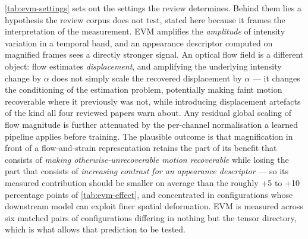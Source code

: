 \autoref{tab:evm-settings} sets out the settings the review determines. Behind them lies a hypothesis the review corpus does not test, stated here because it frames the interpretation of the measurement. EVM amplifies the \textit{amplitude} of intensity variation in a temporal band, and an appearance descriptor computed on magnified frames sees a directly stronger signal. An optical flow field is a different object: flow estimates \textit{displacement}, and amplifying the underlying intensity change by $\alpha$ does not simply scale the recovered displacement by $\alpha$ --- it changes the conditioning of the estimation problem, potentially making faint motion recoverable where it previously was not, while introducing displacement artefacts of the kind all four reviewed papers warn about. Any residual global scaling of flow magnitude is further attenuated by the per-channel normalisation a learned pipeline applies before training. The plausible outcome is that magnification in front of a flow-and-strain representation retains the part of its benefit that consists of \textit{making otherwise-unrecoverable motion recoverable} while losing the part that consists of \textit{increasing contrast for an appearance descriptor} --- so its measured contribution should be smaller on average than the roughly +5 to +10 percentage points of \autoref{tab:evm-effect}, and concentrated in configurations whose downstream model can exploit finer spatial deformation. EVM is measured across six matched pairs of configurations differing in nothing but the tensor directory, which is what allows that prediction to be tested.

